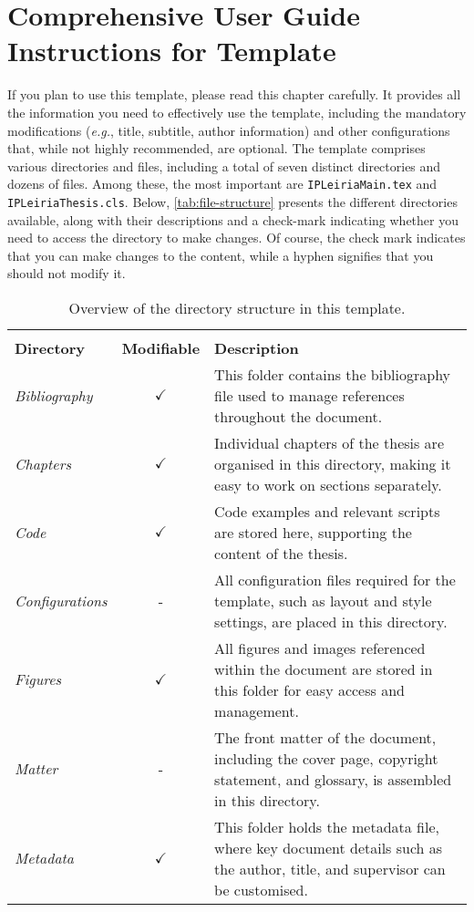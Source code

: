 \chapter[Comprehensive User Guide: Instructions for Using the Template]{Comprehensive User Guide Instructions for Template}\label{cp:user-guide}

If you plan to use this template, please read this chapter carefully. It provides all the information you need to effectively use the template, including the mandatory modifications (\textit{e.g.}, title, subtitle, author information) and other configurations that, while not highly recommended, are optional. The template comprises various directories and files, including a total of seven distinct directories and dozens of files. Among these, the most important are \texttt{IPLeiriaMain.tex} and \texttt{IPLeiriaThesis.cls}. Below, \autoref{tab:file-structure} presents the different directories available, along with their descriptions and a check-mark indicating whether you need to access the directory to make changes. Of course, the check mark indicates that you can make changes to the content, while a hyphen signifies that you should not modify it.

\begin{table}[!htpb]
    \setlength{\extrarowheight}{2pt}
    \caption[Directory structure and file organisation]{Overview of the directory structure in this template.}\label{tab:file-structure}
    \begin{tabularx}{\textwidth}{lcX}
        \toprule
        \\[-1.5\normalbaselineskip]
        \textbf{Directory} & \textbf{Modifiable} & \textbf{Description} \\ [0em]
        \midrule
        \textit{Bibliography} & $\checkmark$ & This folder contains the bibliography file used to manage references throughout the document. \\
        \textit{Chapters} & $\checkmark$ & Individual chapters of the thesis are organised in this directory, making it easy to work on sections separately. \\
        \textit{Code} & $\checkmark$ & Code examples and relevant scripts are stored here, supporting the content of the thesis. \\
        \textit{Configurations} & - & All configuration files required for the template, such as layout and style settings, are placed in this directory. \\
        \textit{Figures} & $\checkmark$ & All figures and images referenced within the document are stored in this folder for easy access and management. \\
        \textit{Matter} & - & The front matter of the document, including the cover page, copyright statement, and glossary, is assembled in this directory. \\
        \textit{Metadata} & $\checkmark$ & This folder holds the metadata file, where key document details such as the author, title, and supervisor can be customised. \\
        \bottomrule
    \end{tabularx}
\end{table}

